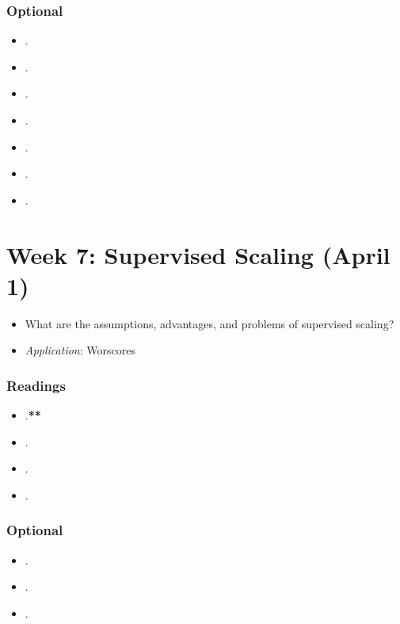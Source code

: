\documentclass[abstract=on,parskip=full,headings=standardclasses,fontsize=11pt,paper=a4]{scrartcl}
\begin{document}
\subsubsection*{Optional}
\begin{itemize}
\item {}.
\item {}.
\item {}.
\item {}.
\item {}.
\item {}.
\item {}.
\end{itemize}

 
\section{Week 7:  Supervised Scaling (April 1)}

\begin{itemize}
\renewcommand\labelitemi{--}
\item What are the assumptions, advantages, and problems of supervised scaling?
\item \textit{Application}: Worscores
\end{itemize}

\subsubsection*{Readings}
\begin{itemize}
\item {}.\textbf{**}
\item {}.
\item {}.
\item {}.
\end{itemize}

\subsubsection*{Optional}
\begin{itemize}
\item {}.
\item {}.
\item {}.
\end{itemize}
\end{document}
